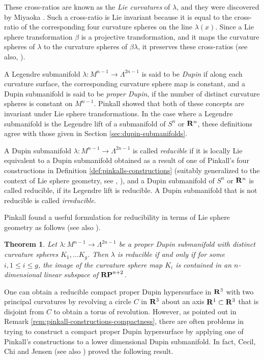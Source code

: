 \documentclass[12pt]{article}
\newtheorem{theorem}{Theorem}[section]
\begin{document}
{These cross-ratios are known as the {\em Lie curvatures} of $\lambda$, and they were 
discovered by Miyaoka \cite{Mi2}.
Such a cross-ratio is Lie invariant because it is equal to
the cross-ratio of the corresponding four curvature spheres
on the line $\lambda (x)$. Since a Lie sphere transformation
$\beta$ is a projective transformation, and it
maps the curvature spheres of $\lambda$ to the
curvature spheres of $\beta \lambda$, it preserves these
cross-ratios (see also, \cite[pp. 72--82]{Cec9}).

A Legendre submanifold $\lambda : M^{n-1} \rightarrow \Lambda ^{2n-1}$ is said to be
{\em Dupin} if along each curvature surface, the corresponding curvature
sphere map is constant, and a Dupin submanifold is said to be {\em proper Dupin}, if the number of
distinct curvature spheres is constant on $ M^{n-1}$.  Pinkall \cite{P2} showed
that both of these concepts are invariant under Lie sphere
transformations.  In the case where a Legendre submanifold is 
the Legendre lift of a submanifold of $S^n$ or  ${\bf R}^n$, these definitions agree with
those given in Section \ref{sec:dupin-submanifolds}.

A Dupin submanifold $\lambda : M^{n-1} \rightarrow \Lambda ^{2n-1}$ is called {\em reducible} if
it is locally Lie equivalent to a  Dupin submanifold obtained as a 
result of one of Pinkall's four constructions in Definition \ref{def:pinkalls-constructions}
(suitably generalized to the context of Lie sphere geometry,
see \cite[pp. 127--148]{Cec9}, \cite{CecGD}), 
and a Dupin submanifold of $S^n$ or  ${\bf R}^n$ is called reducible, if its Legendre
lift is reducible.  A Dupin submanifold that is not reducible is called {\em irreducible}.

Pinkall \cite{P2} found a useful formulation for reducibility
in terms of Lie sphere geometry as follows (see also \cite[pp. 127--148]{Cec9}).
\begin{theorem}
\label{thm:pinkall-reducibility}
Let $\lambda : M^{n-1} \rightarrow \Lambda ^{2n-1}$ be a proper
Dupin submanifold with distinct curvature spheres $K_1,
\ldots K_g$.  Then $\lambda$ is reducible if and only if
for some $i, 1 \leq i \leq g$,  the image of the
curvature sphere map $K_i$ is contained in an
$n$-dimensional linear subspace of ${\bf RP}^{n+2}$.
\end{theorem}

One can obtain a reducible compact proper Dupin hypersurface in ${\bf R}^3$ with two principal curvatures 
by revolving a circle $C$ in ${\bf R}^3$ about an axis ${\bf R}^1 \subset {\bf R}^3$ that is disjoint from $C$ 
to obtain a torus of revolution.
However, as pointed out in Remark \ref{rem:pinkall-constructions-compactness},
there are often problems in trying to construct a compact proper Dupin hypersurface
by applying one of Pinkall's constructions to a lower dimensional Dupin submanifold.  In fact,
Cecil, Chi and Jensen \cite{CCJ2} (see also \cite[pp. 146--147]{Cec9}) proved the following result.

}
\end{document}
